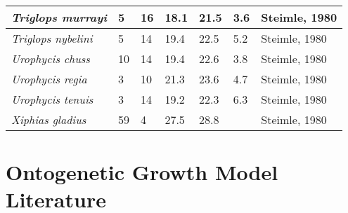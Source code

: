 \documentclass[a4paper]{article} %
\begin{document}
\begin{landscape}
\begin{longtable}[]{|l|p{1.8cm}|p{2cm}|p{2cm}|p{2.15cm}|p{1.9cm}|l|}
    \textit{Triglops murrayi}                & 5                            & 16                         & 18.1                          & 21.5                              & 3.6                      & Steimle, 1980                \\ \hline
    \textit{Triglops nybelini}               & 5                            & 14                         & 19.4                          & 22.5                              & 5.2                      & Steimle, 1980                \\ \hline
    \textit{Urophycis chuss}                 & 10                           & 14                         & 19.4                          & 22.6                              & 3.8                      & Steimle, 1980                \\ \hline
    \textit{Urophycis regia}                 & 3                            & 10                         & 21.3                          & 23.6                              & 4.7                      & Steimle, 1980                \\ \hline
    \textit{Urophycis tenuis}                & 3                            & 14                         & 19.2                          & 22.3                              & 6.3                      & Steimle, 1980                \\ \hline
    \textit{Xiphias gladius}                 & 59                           & 4                          & 27.5                          & 28.8                              &                          & Steimle, 1980                \\ \hline
\end{longtable}
\pagestyle{plain}
\end{landscape}

\newpage
\section{Ontogenetic Growth Model Literature}
\end{document}
